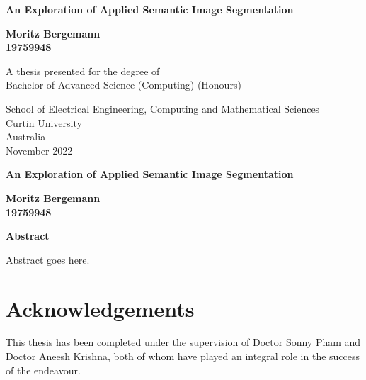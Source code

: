 \documentclass[a4paper,12pt]{report}
\begin{document}
{}
\begin{titlepage}
    \begin{center}
        \vspace*{0.5cm}

        \LARGE
        \textbf{An Exploration of Applied Semantic Image Segmentation}


        \vspace{1.0cm}
        \Large

        \textbf{Moritz Bergemann\\ 19759948}

        \vfill

        A thesis presented for the degree of\\
        Bachelor of Advanced Science (Computing) (Honours)

        \vspace{2.5cm}


        \large
        School of Electrical Engineering, Computing and Mathematical Sciences\\
        Curtin University\\
        Australia\\
        November 2022

    \end{center}
\end{titlepage}

\thispagestyle{plain}
\begin{center}
    \Large
    \textbf{An Exploration of Applied Semantic Image Segmentation}

    \vspace{0.4cm}
    \large

    \vspace{0.4cm}
    \textbf{Moritz Bergemann\\ 19759948}

    \vspace{0.9cm}
    \textbf{Abstract}
\end{center}

Abstract goes here.

\newpage
\chapter*{Acknowledgements}
This thesis has been completed under the supervision of Doctor Sonny Pham and Doctor Aneesh Krishna, both of whom have played an integral role in the success of the endeavour.
\end{document}
